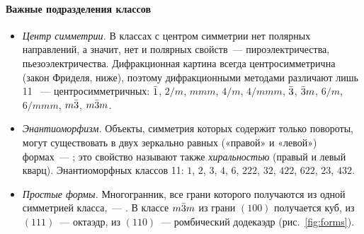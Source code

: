 \paragraph{Важные подразделения классов}
\begin{itemize}
\item \emph{Центр симметрии.} В классах с центром симметрии нет полярных
направлений, а значит, нет и полярных свойств~— пироэлектричества,
пьезоэлектричества. Дифракционная картина всегда центросимметрична
(закон Фриделя, ниже), поэтому дифракционными методами различают лишь
11 ~— центросимметричных:
$\bar{1}$, $2/m$, $mmm$, $4/m$, $4/mmm$, $\bar{3}$, $\bar{3}m$, $6/m$, $6/mmm$, $m\bar{3}$, $m\bar{3}m$.
\item \emph{Энантиоморфизм.} Объекты, симметрия которых содержит только
повороты, могут существовать в двух зеркально равных («правой» и
«левой») формах~— ; это свойство называют также
\emph{хиральностью} (правый и левый кварц). Энантиоморфных классов 11:
$1$, $2$, $3$, $4$, $6$, $222$, $32$, $422$, $622$, $23$, $432$.
\item \emph{Простые формы.} Многогранник, все грани которого получаются из
одной симметрией класса,~— . В классе $m\bar{3}m$ из грани
$(100)$ получается куб, из $(111)$~— октаэдр, из $(110)$~— ромбический
додекаэдр (рис.~\ref{fig:forms}).
\end{itemize}

